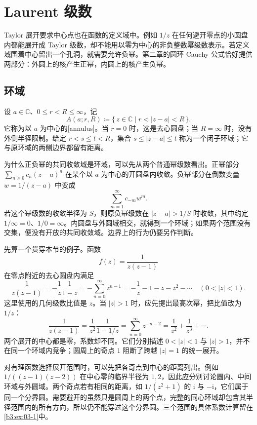 \section{Laurent 级数}
\label{b3:sec:0301}

Taylor 展开要求中心点也在函数的定义域中。例如 \(1/z\) 在任何避开零点的小圆盘内都能展开成 Taylor 级数，却不能用以零为中心的非负整数幂级数表示。若定义域围着中心留出一个孔洞，就需要允许负幂。第二章的圆环 Cauchy 公式恰好提供两部分：外圆上的核产生正幂，内圆上的核产生负幂。

\subsection{环域}
\label{b3:subsec:030101}

设 \(a\in\mathbb C\)、\(0\le r<R\le\infty\)，记
\[
 A(a;r,R)\coloneqq\{\,z\in\mathbb C\mid r<|z-a|<R\,\}.
\]
它称为以 \(a\) 为中心的[annulus]。当 \(r=0\) 时，这是去心圆盘；当 \(R=\infty\) 时，没有外侧半径限制。给定 \(r<s\le t<R\)，集合 \(s\le|z-a|\le t\) 称为一个闭子环域；它与原环域的两侧边界都留有距离。

\ProseParagraphBreak

为什么正负幂的共同收敛域是环域，可以先从两个普通幂级数看出。正幂部分 \(\sum_{n\ge0}c_n(z-a)^n\) 在某个以 \(a\) 为中心的开圆盘内收敛。负幂部分在倒数变量 \(w=1/(z-a)\) 中变成
\[
 \sum_{m=1}^{\infty}c_{-m}w^m.
\]
若这个幂级数的收敛半径为 \(S\)，则原负幂级数在 \(|z-a|>1/S\) 时收敛，其中约定 \(1/\infty=0\)、\(1/0=\infty\)。内圆盘与外圆域相交，就得到一个环域；如果两个范围没有交集，便没有开放的共同收敛域。边界上的行为仍要另作判断。

\ProseParagraphBreak

先算一个贯穿本节的例子。函数
\[
 f(z)=\frac1{z(z-1)}
\]
在零点附近的去心圆盘内满足
\[
 \frac1{z(z-1)}=-\frac1z\frac1{1-z}
 =-\sum_{n=0}^{\infty}z^{n-1}
 =-\frac1z-1-z-z^2-\cdots
 \quad(0<|z|<1).
\]
这里使用的几何级数比值是 \(z\)。当 \(|z|>1\) 时，应先提出最高次幂，把比值改为 \(1/z\)：
\[
 \frac1{z(z-1)}=\frac1{z^2}\frac1{1-1/z}
 =\sum_{n=0}^{\infty}z^{-n-2}
 =\frac1{z^2}+\frac1{z^3}+\cdots.
\]
两个展开的中心都是零，系数却不同。它们分别描述 \(0<|z|<1\) 与 \(|z|>1\)，并不在同一个环域内竞争；圆周上的奇点 \(1\) 阻断了跨越 \(|z|=1\) 的统一展开。

\ProseParagraphBreak

对有理函数选择展开范围时，可以先把各奇点到中心的距离列出。例如 \(1/((z-1)(z-2))\) 在中心零的临界半径为 \(1,2\)，因此应分别讨论圆内、中间环域与外圆域。两个奇点若有相同的距离，如 \(1/(z^2+1)\) 的 \(\mathrm{i}\) 与 \(-\mathrm{i}\)，它们属于同一个分界圆。需要避开的虽然只是圆周上的两个点，完整的同心环域却包含其半径范围内的所有方向，所以仍不能穿过这个分界圆。三个范围的具体系数计算留在\cref{b3:ex:03-1}中。

